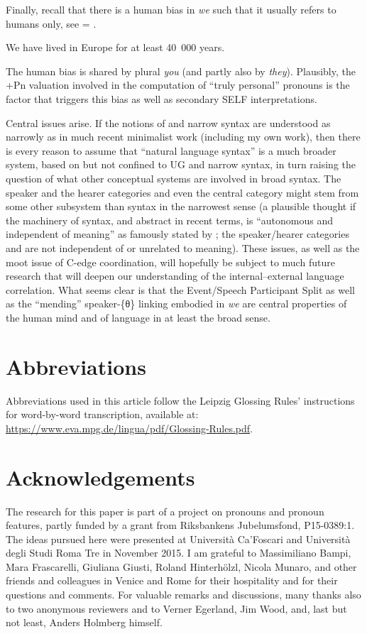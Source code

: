 \documentclass[output=paper]{LSP/langsci}
\begin{document}
Finally, recall that there is a human bias in \textit{we} such that it usually refers to humans only, see  = .

\ea%
    \label{ex:Sigurdsson:45}
      We have lived in Europe for at least 40~000 years.
\z

The human bias is shared by plural \textit{you} (and partly also by \textit{they}). Plausibly, the +Pn valuation involved in the computation of “truly personal” pronouns is the factor that triggers this bias as well as secondary SELF interpretations.

Central issues arise. If the notions of  and narrow syntax are understood as narrowly as in much recent minimalist work (including my own work), then there is every reason to assume that “natural language syntax” is a much broader system, based on but not confined to UG and narrow syntax, in turn raising the question of what other conceptual systems are involved in broad syntax. The speaker and the hearer categories and even the central  category might stem from some other subsystem than syntax in the narrowest sense (a plausible thought if the machinery of syntax,  and abstract  in recent terms, is “autonomous and independent of meaning” as famously stated by \citealt[17]{Chomsky1957}; the speaker/hearer categories and  are not independent of or unrelated to meaning). These issues, as well as the moot issue of C-edge coordination, will hopefully be subject to much future research that will deepen our understanding of the internal–external language correlation. What seems clear is that the Event/Speech Participant Split as well as the “mending” speaker-\{θ\} linking embodied in \textit{we} are central properties of the human mind and of language in at least the broad sense.

\section*{Abbreviations}
Abbreviations used in this article follow the Leipzig Glossing Rules’ instructions for word-by-word transcription, available at: \url{https://www.eva.mpg.de/lingua/pdf/Glossing-Rules.pdf}.

\section*{Acknowledgements}

The research for this paper is part of a project on pronouns and pronoun features, partly funded by a grant from Riksbankens Jubelumsfond, P15-0389:1. The ideas pursued here were presented at Università Ca’Foscari and Università degli Studi Roma Tre in November 2015. I am grateful to Massimiliano Bampi, Mara Frascarelli, Giuliana Giusti, Roland Hinterhölzl, Nicola Munaro, and other friends and colleagues in Venice and Rome for their hospitality and for their questions and comments. For valuable remarks and discussions, many thanks also to two anonymous reviewers and to Verner Egerland, Jim Wood, and, last but not least, Anders Holmberg himself.



\printbibliography[heading=subbibliography,notkeyword=this]
\end{document}
